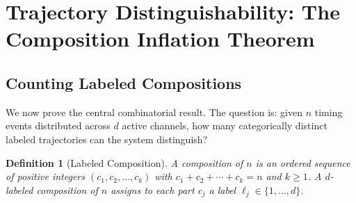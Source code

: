 \documentclass[twocolumn,10pt]{article}
\newtheorem{definition}[theorem]{Definition}
\begin{document}
\section{Trajectory Distinguishability: The Composition Inflation Theorem}
\label{sec:inflation}

\subsection{Counting Labeled Compositions}

We now prove the central combinatorial result. The question is:
given $n$ timing events distributed across $d$ active channels,
how many categorically distinct labeled trajectories can the
system distinguish?

\begin{definition}[Labeled Composition]
\label{def:labeledcomp}
A \emph{composition of $n$} is an ordered sequence of positive integers
$(c_1, c_2, \ldots, c_k)$ with $c_1 + c_2 + \cdots + c_k = n$ and
$k \geq 1$. A \emph{$d$-labeled composition of $n$} assigns to each
part $c_j$ a label $\ell_j \in \{1, \ldots, d\}$.
\end{definition}
\end{document}
